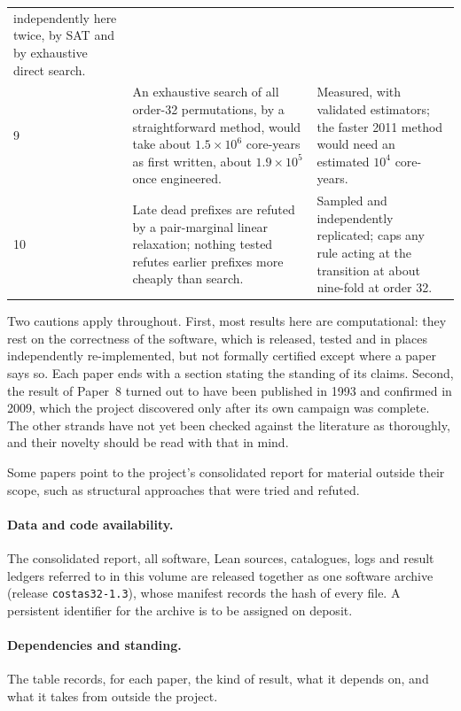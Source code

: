 \begin{center}
\begin{tabular}{@{}p{}>{\raggedright\arraybackslash}p{}>{\raggedright\arraybackslash}p{}@{}}
independently here twice, by SAT and by exhaustive direct search. \\
9 & An exhaustive search of all order-32 permutations, by a straightforward method, would take about $1.5\times10^6$ core-years as first written, about $1.9\times10^5$ once engineered. & Measured, with validated estimators; the faster 2011 method would need an estimated $10^4$ core-years. \\
10 & Late dead prefixes are refuted by a pair-marginal linear relaxation; nothing tested refutes earlier prefixes more cheaply than search. & Sampled and independently replicated; caps any rule acting at the transition at about nine-fold at order 32. \\
\bottomrule
\end{tabular}
\end{center}

Two cautions apply throughout. First, most results here are computational: they rest on the
correctness of the software, which is released, tested and in places independently re-implemented,
but not formally certified except where a paper says so. Each paper ends with a section stating
the standing of its claims. Second, the result of Paper~8 turned out to have been published in 1993
and confirmed in 2009, which the project discovered only after its own campaign was complete. The
other strands have not yet been checked against the literature as thoroughly, and their novelty
should be read with that in mind.

Some papers point to the project's consolidated report for material outside their scope, such as
structural approaches that were tried and refuted.

\paragraph{Data and code availability.} The consolidated report, all software, Lean sources,
catalogues, logs and result ledgers referred to in this volume are released together as one software
archive (release \texttt{costas32-1.3}), whose manifest records the hash of every file. A persistent
identifier for the archive is to be assigned on deposit.

\paragraph{Dependencies and standing.} The table records, for each paper, the kind of result, what it
depends on, and what it takes from outside the project.

